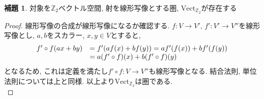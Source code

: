 \documentclass[a4paper]{jsarticle}
\theoremstyle{definition}
\newtheorem{lem}[dfn]{補題}
\newcommand{\Vect}{{\mathrm{Vect}}}
\begin{document}
\begin{lem}
    対象を$\mathbb{Z}_2$ベクトル空間, 射を線形写像とする圏, $\Vect_{\mathbb{Z}_2}$が存在する
\end{lem}
\begin{proof}
    線形写像の合成が線形写像になるか確認する. $f:V\rightarrow V'$, $f':V'\rightarrow V''$を線形写像とし, $a, b$をスカラー, $x, y\in V$とすると, 
\begin{equation}
    \begin{array}{ll}
        f'\circ f(ax+by) & =f'(af(x)+bf(y))=af'(f(x))+bf'(f(y)) \\
         & =a(f'\circ f)(x)+b(f'\circ f)(y)\notag
    \end{array}
\end{equation}
となるため, これは定義を満たし$f'\circ f:V\rightarrow V''$も線形写像となる. 結合法則, 単位法則については上と同様. 以上より$\Vect_{\mathbb{Z}_2}$は圏である.\\
\end{proof}
\end{document}
